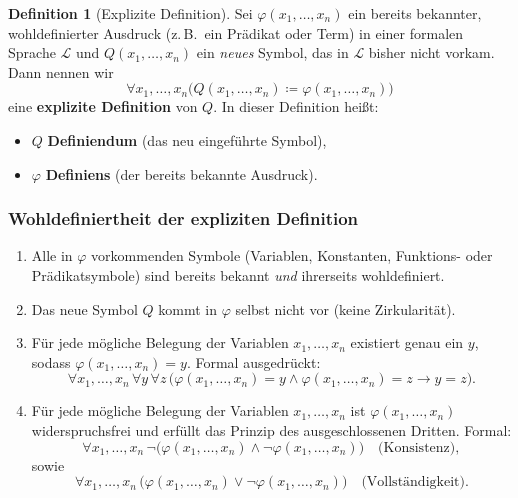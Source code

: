 \documentclass{book}
\theoremstyle{plain}
\theoremstyle{remark}
\theoremstyle{definition}
\newtheorem{definition}{Definition}[section]
\begin{document}
\begin{definition}[Explizite Definition]
Sei \(\varphi(x_1,\dots,x_n)\) ein bereits bekannter, wohldefinierter Ausdruck (z.\,B.\ ein Prädikat oder Term) in einer formalen Sprache \(\mathcal{L}\) und \(Q(x_1,\dots,x_n)\) ein \emph{neues} Symbol, das in \(\mathcal{L}\) bisher nicht vorkam. Dann nennen wir
\[
\forall x_1,\dots,x_n \bigl( Q(x_1,\dots,x_n) \coloneqq \varphi(x_1,\dots,x_n) \bigr)
\]
eine \textbf{explizite Definition} von \(Q\). In dieser Definition heißt:
\begin{itemize}
    \item \(Q\) \textbf{Definiendum} (das neu eingeführte Symbol),
    \item \(\varphi\) \textbf{Definiens} (der bereits bekannte Ausdruck).
\end{itemize}

\noindent
\subsubsection{Wohldefiniertheit der expliziten Definition} 
\begin{enumerate}
    \item Alle in \(\varphi\) vorkommenden Symbole (Variablen, Konstanten, Funktions- oder Prädikatsymbole) sind bereits bekannt \emph{und} ihrerseits wohldefiniert.
    \item Das neue Symbol \(Q\) kommt in \(\varphi\) selbst nicht vor (keine Zirkularität).
    \item Für jede mögliche Belegung der Variablen \(x_1,\dots,x_n\) existiert genau ein \(y\), sodass \(\varphi(x_1,\dots,x_n) = y\). Formal ausgedrückt:
    \[
    \forall x_1,\dots,x_n \, \forall y \, \forall z \, \bigl( \varphi(x_1,\dots,x_n) = y \land \varphi(x_1,\dots,x_n) = z \rightarrow y = z \bigr).
    \]
    \item Für jede mögliche Belegung der Variablen \(x_1, \dots, x_n\) ist \(\varphi(x_1,\dots,x_n)\) widerspruchsfrei und erfüllt das Prinzip des ausgeschlossenen Dritten. Formal:
    \[
    \forall x_1,\dots,x_n \, \neg \bigl( \varphi(x_1,\dots,x_n) \land \neg \varphi(x_1,\dots,x_n) \bigr) \quad \text{(Konsistenz)},
    \]
    sowie
    \[
    \forall x_1,\dots,x_n \, \bigl( \varphi(x_1,\dots,x_n) \lor \neg \varphi(x_1,\dots,x_n) \bigr) \quad \text{(Vollständigkeit)}.
    \]
\end{enumerate}
\end{definition}
\end{document}
